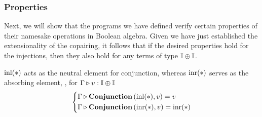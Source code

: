 \vspace{5pt}

\subsubsection{Properties}

Next, we will show that the programs we have defined verify certain properties of their namesake operations in Boolean algebra. Given we have just established the extensionality of the copairing, it follows that if the desired properties hold for the injections, then they also hold for any terms of type $\mathbb{I} \oplus \mathbb{I}$.

  \begin{lemma} \label{lemma:inl_neutral}
     $\mathrm{inl}(*)$ acts as the neutral element for conjunction, whereas $\mathrm{inr}(*)$ serves as the absorbing element, \ie,  for $ \Gamma \triangleright v: \mathbb{I} \oplus \mathbb{I}$
     \[
      \left\{
      \begin{aligned}
      & \Gamma \triangleright \textbf{Conjunction} \, (\mathrm{inl}(*),v) = v  \\
      & \Gamma \triangleright \textbf{Conjunction} \, (\mathrm{inr}(*), v) = \mathrm{inr}(*)
      \end{aligned}
      \right.
      \]
  \end{lemma}

